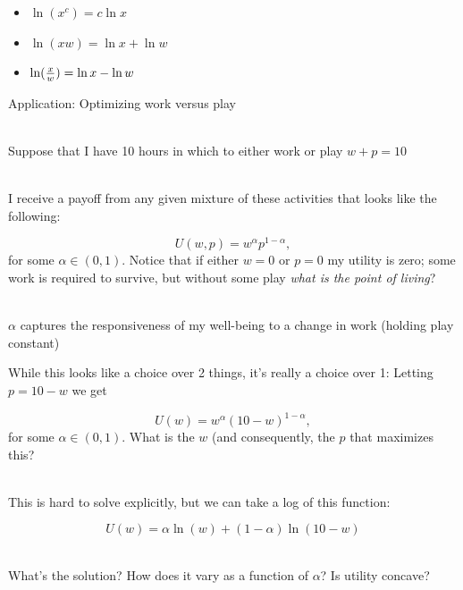 \documentclass[10pt]{seminar}
\begin{document}
\begin{slide}
\begin{itemize}
\item $\ln (x^c)=c\ln x$
\item $\ln (xw)=\ln x+\ln w$
\item $\ln ({x\over w})=\ln x-\ln w$
\end{itemize}

\newslide

Application: Optimizing work versus play

\ \\Suppose that I have 10 hours in which to either work or play $w+p=10$

\ \\I receive a payoff from any given mixture of these activities that looks like the following:

$$U(w, p)=w^\alpha p^{1-\alpha},$$ for some $\alpha\in (0, 1)$.  Notice that if either $w=0$ or $p=0$ my utility is zero; some work is required to survive, but without some play \textit{what is the point of living}?

\ \\$\alpha$ captures the responsiveness of my well-being to a change in work (holding play constant)

\newslide

While this looks like a choice over 2 things, it's really a choice over 1: Letting $p=10-w$ we get


$$U(w)=w^\alpha (10-w)^{1-\alpha},$$ for some $\alpha\in (0, 1)$. What is the $w$ (and consequently, the $p$ that maximizes this?

\ \\This is hard to solve explicitly, but we can take a log of this function:

$$U(w)=\alpha \ln(w)+(1-\alpha)\ln(10-w)$$

\ \\What's the solution? How does it vary as a function of $\alpha$? Is utility concave?
\end{slide}
\end{document}
